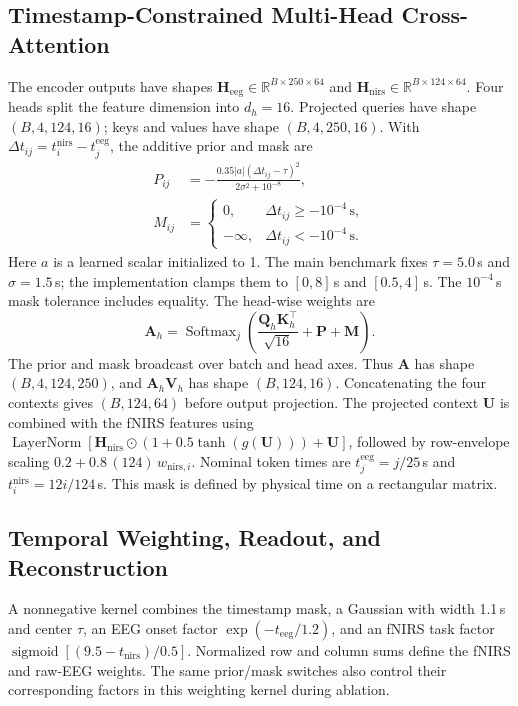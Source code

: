 \documentclass[journal]{IEEEtran}
\begin{document}
\subsection{Timestamp-Constrained Multi-Head Cross-Attention}
The encoder outputs have shapes $\mathbf{H}_{\mathrm{eeg}}\in\mathbb{R}^{B\times250\times64}$ and $\mathbf{H}_{\mathrm{nirs}}\in\mathbb{R}^{B\times124\times64}$. Four heads split the feature dimension into $d_h=16$. Projected queries have shape $(B,4,124,16)$; keys and values have shape $(B,4,250,16)$. With $\Delta t_{ij}=t_i^{\mathrm{nirs}}-t_j^{\mathrm{eeg}}$, the additive prior and mask are
\begin{align}
P_{ij}&=-\frac{0.35|a|(\Delta t_{ij}-\tau)^2}{2\sigma^2+10^{-8}},\\
M_{ij}&=\begin{cases}0,&\Delta t_{ij}\ge-10^{-4}\,\mathrm{s},\\-\infty,&\Delta t_{ij}<-10^{-4}\,\mathrm{s}.\end{cases}
\end{align}
Here $a$ is a learned scalar initialized to 1. The main benchmark fixes $\tau=5.0$\,s and $\sigma=1.5$\,s; the implementation clamps them to $[0,8]$\,s and $[0.5,4]$\,s. The $10^{-4}$\,s mask tolerance includes equality. The head-wise weights are
\begin{equation}
\mathbf{A}_h=\operatorname{Softmax}_{j}\!\left(\frac{\mathbf{Q}_h\mathbf{K}_h^\top}{\sqrt{16}}+\mathbf{P}+\mathbf{M}\right).
\end{equation}
The prior and mask broadcast over batch and head axes. Thus $\mathbf{A}$ has shape $(B,4,124,250)$, and $\mathbf{A}_h\mathbf{V}_h$ has shape $(B,124,16)$. Concatenating the four contexts gives $(B,124,64)$ before output projection. The projected context $\mathbf{U}$ is combined with the fNIRS features using $\operatorname{LayerNorm}[\mathbf{H}_{\mathrm{nirs}}\odot(1+0.5\tanh(g(\mathbf{U})))+\mathbf{U}]$, followed by row-envelope scaling $0.2+0.8\,(124)\,w_{\mathrm{nirs},i}$. Nominal token times are $t_j^{\mathrm{eeg}}=j/25$\,s and $t_i^{\mathrm{nirs}}=12i/124$\,s. This mask is defined by physical time on a rectangular matrix.

\subsection{Temporal Weighting, Readout, and Reconstruction}
A nonnegative kernel combines the timestamp mask, a Gaussian with width 1.1\,s and center $\tau$, an EEG onset factor $\exp(-t_{\mathrm{eeg}}/1.2)$, and an fNIRS task factor $\operatorname{sigmoid}[(9.5-t_{\mathrm{nirs}})/0.5]$. Normalized row and column sums define the fNIRS and raw-EEG weights. The same prior/mask switches also control their corresponding factors in this weighting kernel during ablation.
\end{document}
